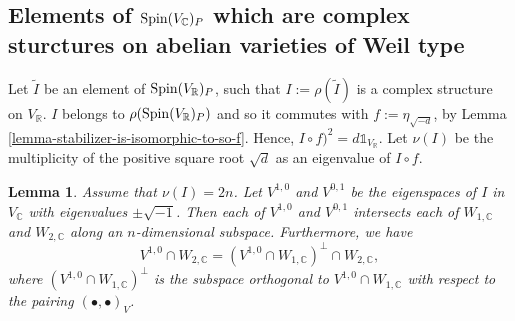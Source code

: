 \documentclass[12pt]{amsart}
\numberwithin{equation}{subsection}
\theoremstyle{plain}
\newtheorem{lem}[thm]{Lemma}
\theoremstyle{definition}
\newcommand{\CC}{{\mathbb C}}
\newcommand{\RR}{{\mathbb R}}
\newcommand{\cm}{\eta}
\newcommand{\Spin}{{\rm Spin}}
\newcommand{\one}{{\mathbb 1}}
\begin{document}
\subsection{Elements of $\Spin(V_\CC)_P$ which are complex sturctures on abelian varieties of Weil type}
\label{sec-complex-structures-in-Spin-V-P}
Let $\tilde{I}$ be an element of $\Spin(V_\RR)_P$, such that $I:=\rho(\tilde{I})$ is a complex structure on $V_\RR$. 
$I$ belongs to $\rho(\Spin(V_\RR)_P)$ and so it commutes with $f:=\cm_{\sqrt{-d}}$, 
by Lemma \ref{lemma-stabilizer-is-isomorphic-to-so-f}. Hence, $I\circ f)^2=d\one_{V_\RR}.$
Let $\nu(I)$ be the multiplicity of the positive square root $\sqrt{d}$ as an eigenvalue of $I\circ f$.


\begin{lem}
\label{lemma-3-dimensional-eigenvalues}
Assume that $\nu(I)=2n$.
Let $V^{1,0}$ and $V^{0,1}$ be the eigenspaces of $I$ in $V_\CC$ with eigenvalues $\pm\sqrt{-1}$.
Then each of $V^{1,0}$ and $V^{0,1}$ intersects each of $W_{1,\CC}$ and $W_{2,\CC}$ along an $n$-dimensional subspace. Furthermore, we have
\begin{equation}
\label{eq-complex-structure-is-determined-by}
V^{1,0}\cap W_{2,\CC}=\left(V^{1,0}\cap W_{1,\CC}\right)^\perp\cap W_{2,\CC},
\end{equation}
where $\left(V^{1,0}\cap W_{1,\CC}\right)^\perp$ is the subspace orthogonal to $V^{1,0}\cap W_{1,\CC}$ with respect to the pairing $(\bullet,\bullet)_V$.
\end{lem}
\end{document}

